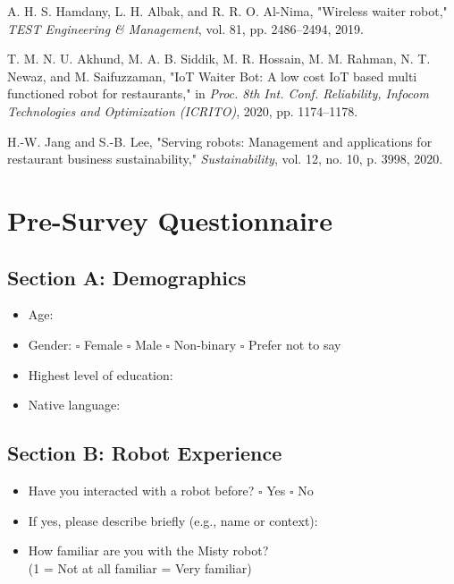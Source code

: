\documentclass[conference]{IEEEtran}
\begin{document}
\begin{thebibliography}{35}
 A. H. S. Hamdany, L. H. Albak, and R. R. O. Al-Nima, "Wireless waiter robot," \textit{TEST Engineering \& Management}, vol. 81, pp. 2486–2494, 2019.

 T. M. N. U. Akhund, M. A. B. Siddik, M. R. Hossain, M. M. Rahman, N. T. Newaz, and M. Saifuzzaman, "IoT Waiter Bot: A low cost IoT based multi functioned robot for restaurants," in \textit{Proc. 8th Int. Conf. Reliability, Infocom Technologies and Optimization (ICRITO)}, 2020, pp. 1174–1178.

 H.-W. Jang and S.-B. Lee, "Serving robots: Management and applications for restaurant business sustainability," \textit{Sustainability}, vol. 12, no. 10, p. 3998, 2020.

\end{thebibliography}


\appendices

\section{Pre-Survey Questionnaire}

\subsection{Section A: Demographics}
\begin{itemize}
\item Age: \underline{\hspace{2cm}}
\item Gender: $\square$ Female \quad $\square$ Male \quad $\square$ Non-binary \quad $\square$ Prefer not to say
\item Highest level of education: \underline{\hspace{3cm}}
\item Native language: \underline{\hspace{3cm}}
\end{itemize}

\subsection{Section B: Robot Experience}
\begin{itemize}
\item Have you interacted with a robot before? $\square$ Yes \quad $\square$ No
\item If yes, please describe briefly (e.g., name or context): \underline{\hspace{5cm}}
\item How familiar are you with the Misty robot? \\
(1 = Not at all familiar     = Very familiar)
\end{itemize}
\end{document}
